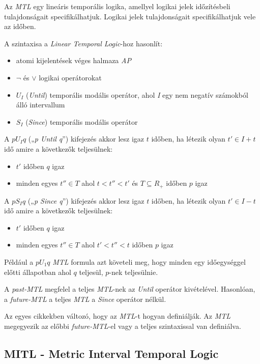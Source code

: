 Az \textit{MTL} egy lineáris temporális logika, amellyel logikai jelek időzítésbeli tulajdonságait specifikálhatjuk.
Logikai jelek tulajdonságait specifikálhatjuk vele az időben.

A szintaxisa a \textit{Linear Temporal Logic}-hoz hasonlít:
\begin{itemize}
    \item atomi kijelentések véges halmaza \textit{AP}
    \item $\neg$ és $\lor$ logikai operátorokat
    \item $U_I$ (\textit{Until}) temporális modális operátor, ahol \textit{I} egy nem negatív számokból álló intervallum
    \item $S_I$ (\textit{Since}) temporális modális operátor
\end{itemize}

A $p U_I q$ („\textit{p Until q}”) kifejezés akkor lesz igaz $t$ időben, ha létezik olyan $t' \in I + t$ idő amire a következők teljesülnek:
\begin{itemize}
    \item $t'$ időben $q$ igaz
    \item minden egyes $t'' \in T$ ahol $t < t'' < t'$ és $T 	\subseteq {R} _{+}$ időben $p$ igaz
\end{itemize}

A $p S_I q$ („\textit{p Since q}”) kifejezés akkor lesz igaz $t$ időben, ha létezik olyan $t' \in I - t$ idő amire a következők teljesülnek:
\begin{itemize}
    \item $t'$ időben $q$ igaz
    \item minden egyes $t'' \in T$ ahol $t' < t'' < t$ időben $p$ igaz
\end{itemize}

Például a $p U_{1} q$ \textit{MTL} formula azt követeli meg, hogy minden egy időegységgel előtti állapotban ahol $q$ teljesül, $p$-nek teljesülnie.

A \textit{past-MTL} megfelel a teljes \textit{MTL}-nek az \textit{Until} operátor kivételével.
Hasonlóan, a \textit{future-MTL} a teljes \textit{MTL} a \textit{Since} operátor nélkül.

Az egyes cikkekben változó, hogy az \textit{MTL}-t hogyan definiálják.
Az \textit{MTL} megegyezik az előbbi \textit{future-MTL}-el vagy a teljes szintaxissal van definiálva.

\subsection{MITL - Metric Interval Temporal Logic}

